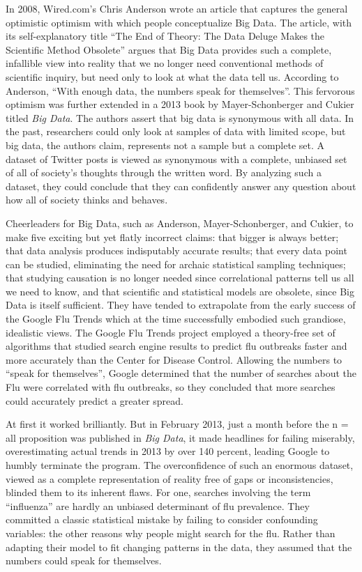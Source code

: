 \documentclass[sigconf]{acmart}
\begin{document}
	In 2008, Wired.com's Chris Anderson wrote an article that captures the general optimistic optimism with which people conceptualize Big Data. The article, with its self-explanatory title ``The End of Theory: The Data Deluge Makes the Scientific Method Obsolete'' argues that Big Data provides such a complete, infallible view into reality that we no longer need conventional methods of scientific inquiry, but need only to look at what the data tell us. According to Anderson, ``With enough data, the numbers speak for themselves''\cite{Anderson2008}. This fervorous optimism was further extended in a 2013 book by Mayer-Schonberger and Cukier titled {\em Big Data}. The authors assert that big data is synonymous with all data. In the past, researchers could only look at samples of data with limited scope, but big data, the authors claim, represents not a sample but a complete set\cite{Lagoze2014}. A dataset of Twitter posts is viewed as synonymous with a complete, unbiased set of all of society's thoughts through the written word. By analyzing such a dataset, they could conclude that they can confidently answer any question about how all of society thinks and behaves\cite{Harford2014}.

Cheerleaders for Big Data, such as Anderson, Mayer-Schonberger, and Cukier, to make five exciting but yet flatly incorrect claims: that bigger is always better; that data analysis produces indisputably accurate results; that every data point can be studied, eliminating the need for archaic statistical sampling techniques; that studying causation is no longer needed since correlational patterns tell us all we need to know, and that scientific and statistical models are obsolete, since Big Data is itself sufficient. They have tended to extrapolate from the early success of the Google Flu Trends which at the time successfully embodied such grandiose, idealistic views. The Google Flu Trends project employed a theory-free set of algorithms that studied search engine results to predict flu outbreaks faster and more accurately than the Center for Disease Control. Allowing the numbers to ``speak for themselves'', Google determined that the number of searches about the Flu were correlated with flu outbreaks, so they concluded that more searches could accurately predict a greater spread\cite{Harford2014}. 

At first it worked brilliantly. But in February 2013, just a month before the n = all proposition was published in {\em Big Data}, it made headlines for failing miserably, overestimating actual trends in 2013 by over 140 percent, leading Google to humbly terminate the program. The overconfidence of such an enormous dataset, viewed as a complete representation of reality free of gaps or inconsistencies, blinded them to its inherent flaws. For one, searches involving the term ``influenza'' are hardly an unbiased determinant of flu prevalence. They committed a classic statistical mistake by failing to consider confounding variables: the other reasons why people might search for the flu. Rather than adapting their model to fit changing patterns in the data, they assumed that the numbers could speak for themselves\cite{Harford2014}. 
\end{document}

